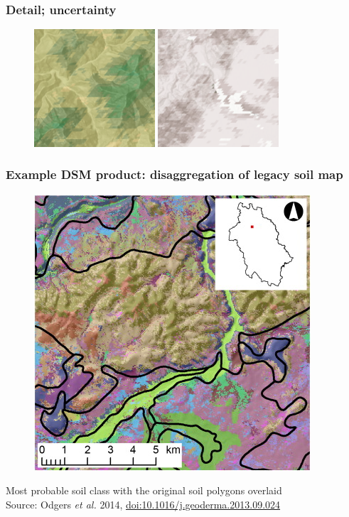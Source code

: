 \documentclass[aspectratio=169, 10pt]{beamer}
\begin{document}
\begin{frame}
  \frametitle{Detail; uncertainty}
\begin{figure}
\includegraphics[width=0.4\textwidth]{./graphics_david/SoilGridsDetail.png}
\hfill
\includegraphics[width=0.4\textwidth]{./graphics_david/SoilGridsUncertainty.png}
\end{figure}
\end{frame}

\begin{frame}
  \frametitle{Example DSM product: disaggregation of legacy soil map}
\begin{figure}
  \includegraphics[height=0.55\textheight]{./graphics_david/1-s2.0-S0016706113003522-gr9.jpg}
\end{figure}
Most probable soil class with the original soil polygons overlaid
\\
Source: Odgers \emph{et al.} 2014, \url{doi:10.1016/j.geoderma.2013.09.024}
\end{frame}
\end{document}

